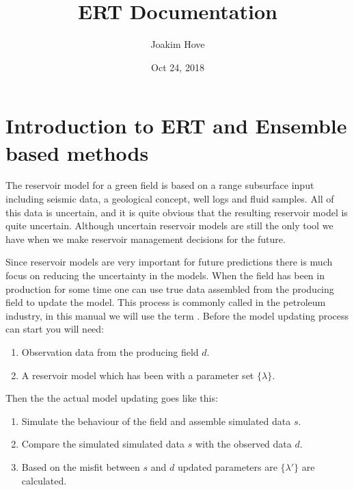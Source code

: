 \documentclass[a4paper,10pt,english]{sphinxmanual}
\title{ERT Documentation}
\date{Oct 24, 2018}
\author{Joakim Hove}
\begin{document}
\maketitle
\sphinxtableofcontents
{}\label{\detokenize{manual::doc}}



\chapter{Introduction to ERT and Ensemble based methods}
\label{\detokenize{introduction/index:introduction-to-ert-and-ensemble-based-methods}}\label{\detokenize{introduction/index::doc}}\label{\detokenize{introduction/index:welcome-to-ert-s-documentation}}
The reservoir model for a green field is based on a range subsurface input
including seismic data, a geological concept, well logs and fluid samples. All
of this data is uncertain, and it is quite obvious that the resulting reservoir
model is quite uncertain. Although uncertain reservoir models are still the only
tool we have when we make reservoir management decisions for the future.

Since reservoir models are very important for future predictions there is much
focus on reducing the uncertainty in the models. When the field has been in
production for some time one can use true data assembled from the producing
field to update the model. This process is commonly called  in
the petroleum industry, in this manual we will use the term .
Before the model updating process can start you will need:
\begin{enumerate}
\item {} 
Observation data from the producing field \(d\).

\item {} 
A reservoir model which has been  with a parameter set \(\{\lambda\}\).

\end{enumerate}

Then the the actual model updating goes like this:
\begin{enumerate}
\item {} 
Simulate the behaviour of the field and assemble simulated data \(s\).

\item {} 
Compare the simulated simulated data \(s\) with the observed data \(d\).

\item {} 
Based on the misfit between \(s\) and \(d\) updated parameters are
\(\{\lambda'\}\) are calculated.

\end{enumerate}
\end{document}
